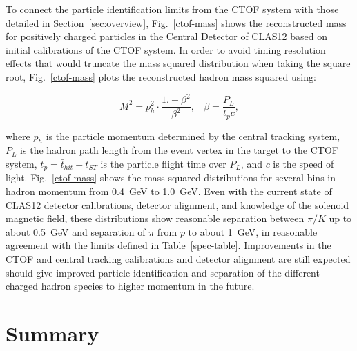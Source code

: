 \documentclass[3p,times,twocolumn]{elsarticle}
\begin{document}
To connect the particle identification limits from the CTOF system with those detailed in
Section~\ref{sec:overview}, Fig.~\ref{ctof-mass} shows the reconstructed mass for positively charged
particles in the Central Detector of CLAS12 based on initial calibrations of the CTOF system. In order to
avoid timing resolution effects that would truncate the mass squared distribution when taking the square
root, Fig.~\ref{ctof-mass} plots the reconstructed hadron mass squared using:

\begin{equation}
M^2 = p_h^2 \cdot \frac{1.-\beta^2}{\beta^2},~~~~\beta=\frac{P_L}{t_p c},
\end{equation}

\noindent
where $p_h$ is the particle momentum determined by the central tracking system, $P_L$ is the hadron
path length from the event vertex in the target to the CTOF system, $t_p= \bar{t}_{hit} - t_{ST}$ is
the particle flight time over $P_L$, and $c$ is the speed of light. Fig.~\ref{ctof-mass} shows the mass
squared distributions for several bins in hadron momentum from 0.4~GeV to 1.0~GeV. Even with the current
state of CLAS12 detector calibrations, detector alignment, and knowledge of the solenoid magnetic field,
these distributions show reasonable separation between $\pi/K$ up to about 0.5~GeV and separation of
$\pi$ from $p$ to about 1~GeV, in reasonable agreement with the limits defined in Table~\ref{spec-table}.
Improvements in the CTOF and central tracking calibrations and detector alignment are still expected
should give improved particle identification and separation of the different charged hadron species to
higher momentum in the future.

\section{Summary}
\label{sec:summary}
\end{document}
